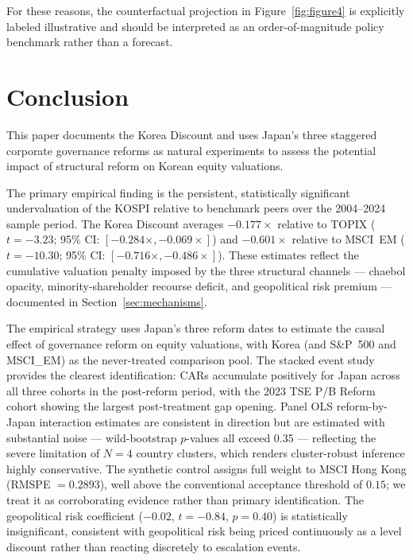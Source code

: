 \documentclass[12pt]{article}
\begin{document}
For these reasons, the counterfactual projection in Figure~\ref{fig:figure4} is explicitly
labeled illustrative and should be interpreted as an order-of-magnitude policy benchmark
rather than a forecast.

\section{Conclusion}
\label{sec:conclusion}

This paper documents the Korea Discount and uses Japan's three staggered corporate governance
reforms as natural experiments to assess the potential impact of structural reform on Korean
equity valuations.

The primary empirical finding is the persistent, statistically significant undervaluation
of the KOSPI relative to benchmark peers over the 2004--2024 sample period. The Korea
Discount averages $-0.177\times$ relative to TOPIX ($t = -3.23$; 95\% CI: $[-0.284\times,
-0.069\times]$) and $-0.601\times$ relative to MSCI~EM ($t = -10.30$; 95\% CI: $[-0.716\times,
-0.486\times]$). These estimates reflect the cumulative valuation penalty imposed by the
three structural channels --- chaebol opacity, minority-shareholder recourse deficit, and
geopolitical risk premium --- documented in Section~\ref{sec:mechanisms}.

The empirical strategy uses Japan's three reform dates to estimate the causal effect of
governance reform on equity valuations, with Korea (and S\&P~500 and MSCI\_EM) as the
never-treated comparison pool. The stacked event study provides the clearest identification:
CARs accumulate positively for Japan across all three cohorts in the post-reform period,
with the 2023 TSE P/B Reform cohort showing the largest post-treatment gap opening. Panel
OLS reform-by-Japan interaction estimates are consistent in direction but are estimated
with substantial noise --- wild-bootstrap $p$-values all exceed 0.35 --- reflecting the
severe limitation of $N = 4$ country clusters, which renders cluster-robust inference
highly conservative. The synthetic control assigns full weight to MSCI Hong Kong
(RMSPE $= 0.2893$), well above the conventional acceptance threshold of $0.15$; we treat
it as corroborating evidence rather than primary identification. The geopolitical risk
coefficient ($-0.02$, $t = -0.84$, $p = 0.40$) is statistically insignificant, consistent
with geopolitical risk being priced continuously as a level discount rather than reacting
discretely to escalation events.
\end{document}
